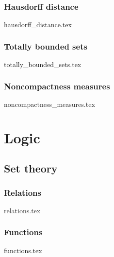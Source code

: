 \documentclass[numbers=endperiod, bibliography=totocnumbered]{scrartcl}
\begin{document}
\subsubsection{Hausdorff distance}\label{sec:hausdorff_distance}
{hausdorff_distance.tex}
\subsubsection{Totally bounded sets}\label{sec:totally_bounded_sets}
{totally_bounded_sets.tex}
\subsubsection{Noncompactness measures}\label{sec:noncompactness_measures}
{noncompactness_measures.tex}

\section{Logic}\label{sec:logic}
\subsection{Set theory}\label{sec:sets}
\subsubsection{Relations}\label{sec:relations}
{relations.tex}
\subsubsection{Functions}\label{sec:functions}
{functions.tex}

\printbibliography
\end{document}
